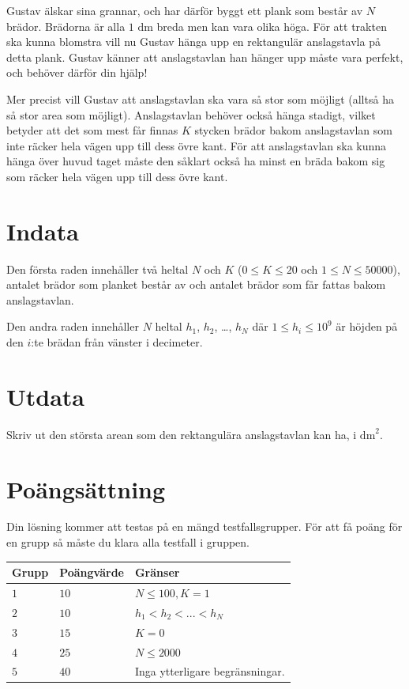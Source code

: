 Gustav älskar sina grannar, och har därför byggt ett plank som består av $N$ brädor. Brädorna är alla $1 \text{ dm}$ breda men kan vara olika höga. 
För att trakten ska kunna blomstra vill nu Gustav hänga upp en rektangulär anslagstavla på detta plank.
Gustav känner att anslagstavlan han hänger upp måste vara perfekt, och behöver därför din hjälp!

Mer precist vill Gustav att anslagstavlan ska vara så stor som möjligt (alltså ha så stor area som möjligt).
Anslagstavlan behöver också hänga stadigt, vilket betyder att det som mest får finnas $K$ stycken brädor bakom anslagstavlan som inte räcker hela vägen upp till dess övre kant.
För att anslagstavlan ska kunna hänga över huvud taget måste den såklart också ha minst en bräda bakom sig som räcker hela vägen upp till dess övre kant.

\section*{Indata}
Den första raden innehåller två heltal $N$ och $K$ ($0 \le K \le 20$ och $1 \le N \le 50 000$), antalet brädor som planket består av och antalet brädor som får fattas bakom anslagstavlan.

Den andra raden innehåller $N$ heltal $h_{1}$, $h_{2}$, \dots, $h_{N}$ där $1 \le h_{i} \le 10^{9}$ är höjden på den $i$:te brädan från vänster i decimeter.

\section*{Utdata}
Skriv ut den största arean som den rektangulära anslagstavlan kan ha, i $\text{dm}^{2}$.

\section*{Poängsättning}
Din lösning kommer att testas på en mängd testfallsgrupper.
För att få poäng för en grupp så måste du klara alla testfall i gruppen.

\noindent
\begin{tabular}{| l | l | l |}
  \hline
  Grupp & Poängvärde & Gränser \\ \hline
  $1$    & $10$       &  $N \le 100, K = 1$\\ \hline 
  $2$    & $10$       &  $h_{1} < h_{2} < ... < h_{N}$ \\ \hline
  $3$    & $15$        &  $K = 0$ \\ \hline
  $4$    & $25$        &  $N \le 2000 $ \\ \hline
  $5$    & $40$       &  Inga ytterligare begränsningar. \\ \hline
\end{tabular}
